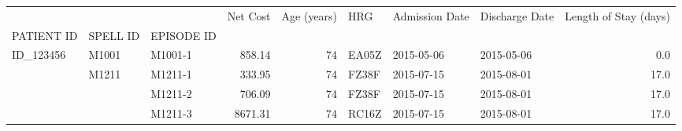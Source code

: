 \begin{tabular}{lllrrlllr}
\toprule
&            &              &      Net Cost &   Age (years) &    HRG &
Admission Date &    Discharge Date &  Length of Stay (days) \\
PATIENT ID & SPELL ID & EPISODE ID &              &       &        &             &             &           \\
\midrule
ID\_123456 & M1001 & M1001-1 &   858.14 &  74 &  EA05Z &  2015-05-06 &  2015-05-06 &       0.0 \\
                   & M1211 & M1211-1 &   333.95 &  74 &  FZ38F &  2015-07-15 &  2015-08-01 &      17.0 \\
                   &            & M1211-2 &   706.09 &  74 &  FZ38F &  2015-07-15 &  2015-08-01 &      17.0 \\
                   &            & M1211-3 &  8671.31 &  74 &  RC16Z &  2015-07-15 &  2015-08-01 &      17.0 \\
\bottomrule
\end{tabular}
